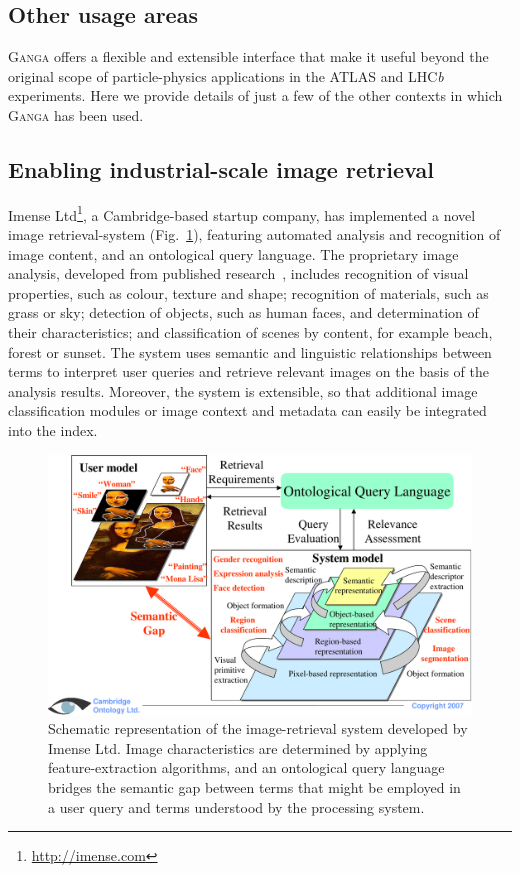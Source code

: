 \documentclass{elsart}
\def\lhcb {LHC{\em b\/}\xspace}
\def\atlas {ATLAS\xspace}
\def\ganga {\textsc{Ganga}\xspace}
\begin{document}
\begin{linenumbers}
\section{Other usage areas}
\label{sec:other}
\ganga offers a flexible and extensible interface that make it useful
beyond the original scope of particle-physics
applications in the \atlas and \lhcb experiments. Here we provide
details of just a few of the other contexts in which \ganga has been
used.

\subsection{Enabling industrial-scale image retrieval}
\label{sec:Imense}
Imense Ltd\footnote{\url{http://imense.com}}, a Cambridge-based startup
company, has implemented a novel image retrieval-system
(Fig.~\ref{fig:camtologytech}), featuring automated analysis
and recognition of image content, and an ontological query language. The
proprietary image analysis, developed from published research~\cite{town_2004},
includes recognition of visual properties, such as colour, texture
and shape; recognition of materials, such as grass or sky; detection of
objects, such as human faces, and determination of their characteristics; and
classification of scenes by content, for example beach, forest or
sunset.  The system uses semantic and linguistic relationships between terms to
interpret user queries and retrieve relevant images on the basis of the
analysis results. Moreover, the system is extensible, so that
additional image classification modules or image context and metadata can
easily be integrated into the index.
\begin{figure}[htb]
  \begin{center}
    \includegraphics[width=0.85 \textwidth]{camtologyfigure}
  \end{center}
  \caption{Schematic representation of the image-retrieval system developed by
Imense Ltd. Image characteristics are determined by applying feature-extraction
algorithms, and an ontological query language bridges the semantic gap between
terms that might be employed in a user query and terms understood by
the processing system.}
  \label{fig:camtologytech}
\end{figure}


\end{linenumbers}
\end{document}
